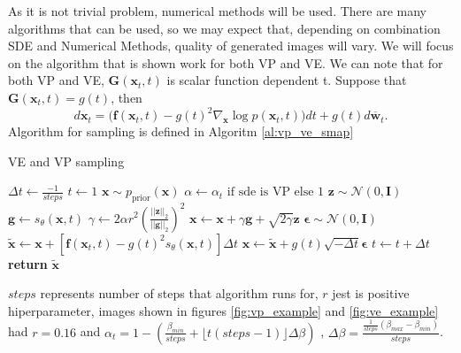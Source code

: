 \documentclass[10pt]{article}
\begin{document}
As it is not trivial problem, numerical methods will be used. There are many algorithms that can be used, 
so we may expect that, depending on combination SDE and Numerical Methods, quality of generated images will vary. We will focus on the algorithm that is shown work for both VP and VE. We can note that for both VP and VE, $\textbf{G}(\textbf{x}_t, t)$ is scalar function dependent t. Suppose that $\textbf{G}(\textbf{x}_t, t) = g(t)$, then 
\begin{equation}
     d \textbf{x}_t = \Big( \textbf{f}(\textbf{x}_t , t) - g(t)^2 
    \nabla_{\textbf{x}} \log p(\textbf{x}_t , t) \Big) dt 
    + g(t) d \overline{\textbf{w}}_t.
\end{equation}
Algorithm for sampling is defined in Algoritm \ref{al:vp_ve_smap}
\begin{algorithm} [H]
\caption{VE and VP sampling}\label{alg:ve_vp_sample}
\label{al:vp_ve_smap}
\begin{algorithmic}
    \State $\Delta t \gets \frac{-1}{steps}$
    \State $t \gets 1 $
    \State $\textbf{x} \sim p_{\text{prior}}(\textbf{x})$
        \State $\alpha \gets \alpha_t \text{ if sde  is VP else 1}$
        \State $\textbf{z} \sim \mathcal{N}(0, \mathbf{I})$
        \State $\textbf{g}\gets s_{\theta}(\textbf{x} , t) $
        \State $\gamma \gets 2 \alpha r^2 (\frac{||\textbf{z} ||_2}{||\textbf{g} ||_2})^2$
        \State $\textbf{x} \gets \textbf{x} + \gamma \textbf{g} + \sqrt{2 \gamma} \textbf{z}$
        \State $\bm{\epsilon} \sim \mathcal{N}(0, \mathbf{I})$
        \State $\tilde{\textbf{x}} \gets \textbf{x} + \left[\textbf{f}(\textbf{x}_t , t) - g(t)^2 s_{\theta}(\textbf{x} , t) \right]\Delta t$
        \State $\textbf{x} \gets \tilde{\textbf{x}} + g(t) \sqrt{- \Delta t} \bm{\epsilon}$
    \State $t \gets t + \Delta t$
    \EndWhile
\State \textbf{return} $\tilde{\textbf{x}}$
\end{algorithmic}
\end{algorithm}
\noindent
$steps$ represents number of steps that algorithm runs for, $r$ jest is positive hiperparameter, images shown in figures \ref{fig:vp_example} and \ref{fig:ve_example} had $r = 0.16$ and   $\alpha_t = 1 - (\frac{\beta_{min}}{steps} + \lfloor t (steps - 1) \rfloor \Delta \beta)$ , $\Delta \beta = \frac{\frac{1}{steps}(\beta_{max} - \beta_{min})}{steps}$.
\end{document}
